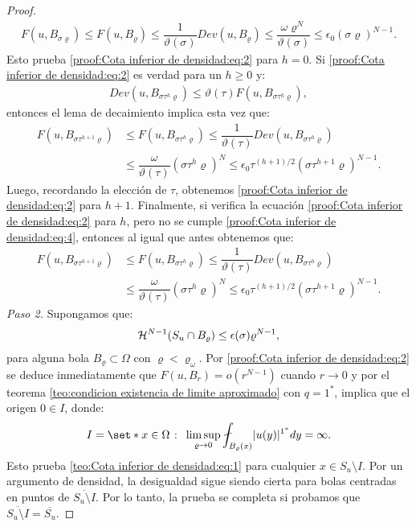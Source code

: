 \documentclass[a4paper,11pt,spanish, twoside, leqno]{tfm-uam}
\begin{document}
\begin{proof}
\begin{align*}
F(u, B_{\sigma\varrho})\leq F(u,B_{\varrho})\leq \dfrac{1}{\vartheta(\sigma)}Dev(u, B_{\varrho})\leq \dfrac{\omega \varrho^{N}}{\vartheta(\sigma)}\leq \epsilon_{0}(\sigma\varrho)^{N-1}.
\end{align*}
Esto prueba \ref{proof:Cota inferior de densidad:eq:2} para $h=0$. Si \ref{proof:Cota inferior de densidad:eq:2} es verdad para un $h\geq 0$ y:
\begin{align}\label{proof:Cota inferior de densidad:eq:4}
Dev(u,B_{\sigma\tau^{h}\varrho})\leq \vartheta(\tau)F(u,B_{\sigma\tau^{h}\varrho}),
\end{align}
entonces el lema de decaimiento implica esta vez que:
\begin{align*}
F(u,B_{\sigma \tau^{h+1}\varrho})&\leq F(u, B_{\sigma\tau^{h}\varrho})\leq \dfrac{1}{\vartheta(\tau)}Dev(u, B_{\sigma \tau^{h}\varrho})\\
&\leq \dfrac{\omega}{\vartheta(\tau)}(\sigma\tau^{h}\varrho)^{N}\leq \epsilon_{0}\tau^{(h+1)/2}(\sigma\tau^{h+1}\varrho)^{N-1}.
\end{align*}
Luego, recordando la elección de $\tau$, obtenemos \ref{proof:Cota inferior de densidad:eq:2} para $h+1$. Finalmente, si verifica la ecuación \ref{proof:Cota inferior de densidad:eq:2} para $h$, pero no se cumple \ref{proof:Cota inferior de densidad:eq:4}, entonces al igual que antes obtenemos que:
\begin{align*}
F(u, B_{\sigma\tau^{h+1}\varrho})&\leq F(u, B_{\sigma\tau^{h}\varrho})\leq \dfrac{1}{\vartheta(\tau)}Dev(u, B_{\sigma\tau^{h}\varrho})\\
&\leq \dfrac{\omega}{\vartheta(\tau)}(\sigma \tau^{h}\varrho)^{N}\leq \epsilon_{0}\tau^{(h+1)/2}(\sigma\tau^{h+1}\varrho)^{N-1}.
\end{align*}
\textit{Paso 2.} Supongamos que:
\begin{align*}
\mathcal{H}^{N-1}(S_{u}\cap B_{\varrho})\leq \epsilon(\sigma)\varrho^{N-1},
\end{align*}
para alguna bola $B_{\varrho}\subset \Omega$ con $\varrho<\varrho_{\omega}$. Por \ref{proof:Cota inferior de densidad:eq:2} se deduce inmediatamente que $F(u,B_{r})=o(r^{N-1})$ cuando $r\to 0$ y por el teorema \ref{teo:condicion existencia de limite aproximado} con $q=1^{*}$, implica que el origen $0\in I$, donde:
\begin{align*}
I=\set*{x\in \Omega \given \limsup_{\varrho\to 0} \fint_{B_{\varrho}(x)}\abs{u(y)}^{1^{*}}dy=\infty}.
\end{align*}
Esto prueba \ref{teo:Cota inferior de densidad:eq:1} para cualquier $x\in S_{u}\setminus I$. Por un argumento de densidad, la desigualdad sigue siendo cierta para bolas centradas en puntos de $\overline{S_{u}\setminus I}$. Por lo tanto, la prueba se completa si probamos que $\overline{S_{u}\setminus I}=\overline{S_{u}}$.


\end{proof}
\end{document}
